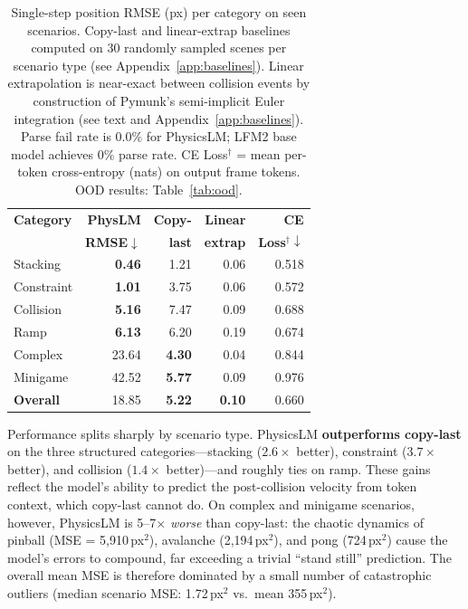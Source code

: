 \documentclass{article}
\begin{document}
\begin{table}[t]
\centering
\caption{Single-step position RMSE (px) per category on seen scenarios.
Copy-last and linear-extrap baselines computed on 30 randomly sampled scenes per
scenario type (see Appendix~\ref{app:baselines}).
Linear extrapolation is near-exact between collision events by construction
of Pymunk's semi-implicit Euler integration (see text and Appendix~\ref{app:baselines}).
Parse fail rate is 0.0\% for PhysicsLM; LFM2 base model achieves 0\% parse rate.
CE Loss$^\dagger$ = mean per-token cross-entropy (nats) on output frame tokens.
OOD results: Table~\ref{tab:ood}.}
\label{tab:category}
\small
\begin{tabular}{lrrr@{\hspace{4pt}}r}
\toprule
\textbf{Category} & \textbf{PhysLM} & \textbf{Copy-} & \textbf{Linear} & \textbf{CE} \\
                  & \textbf{RMSE$\downarrow$} & \textbf{last} & \textbf{extrap} & \textbf{Loss$^\dagger\downarrow$} \\
\midrule
Stacking    & \textbf{0.46} & 1.21 & 0.06 & 0.518 \\
Constraint  & \textbf{1.01} & 3.75 & 0.06 & 0.572 \\
Collision   & \textbf{5.16} & 7.47 & 0.09 & 0.688 \\
Ramp        & \textbf{6.13} & 6.20 & 0.19 & 0.674 \\
Complex     &       23.64   & \textbf{4.30} & 0.04 & 0.844 \\
Minigame    &       42.52   & \textbf{5.77} & 0.09 & 0.976 \\
\midrule
\textbf{Overall} & 18.85 & \textbf{5.22} & \textbf{0.10} & 0.660 \\
\bottomrule
\end{tabular}
\end{table}

Performance splits sharply by scenario type. PhysicsLM \textbf{outperforms copy-last}
on the three structured categories---stacking ($2.6\times$ better), constraint
($3.7\times$ better), and collision ($1.4\times$ better)---and roughly ties on ramp.
These gains reflect the model's ability to predict the post-collision velocity from
token context, which copy-last cannot do. On complex and minigame scenarios,
however, PhysicsLM is 5--7$\times$ \emph{worse} than copy-last: the chaotic
dynamics of pinball (MSE = 5,910\,px$^2$), avalanche (2,194\,px$^2$), and pong
(724\,px$^2$) cause the model's errors to compound, far exceeding a trivial
``stand still'' prediction. The overall mean MSE is therefore dominated by a small
number of catastrophic outliers (median scenario MSE: 1.72\,px$^2$ vs.\ mean 355\,px$^2$).
\end{document}
